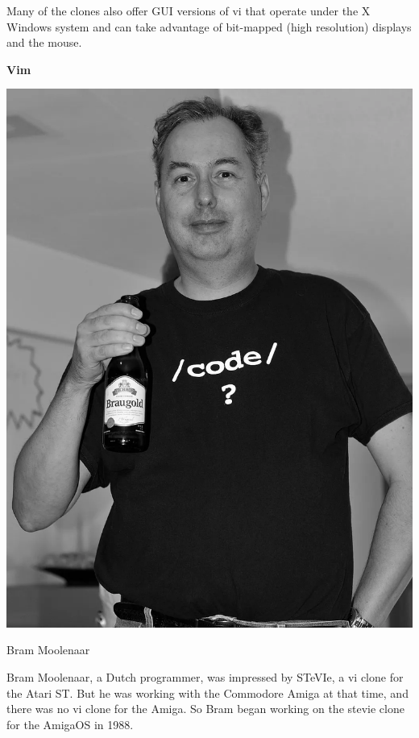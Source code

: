 Many of the clones also offer GUI versions of vi that operate under the X Windows system and can take advantage of bit-mapped (high resolution) displays and the mouse.

\textbf{Vim}

\begin{marginfigure}
  \includegraphics{images/png/bram.png}
  \caption{Bram Moolenaar}
\end{marginfigure}

Bram Moolenaar, a Dutch programmer, was impressed by
STeVIe, a vi clone for the Atari ST.
But he was working with the Commodore Amiga at that time,
and there was no vi clone for the Amiga.
So Bram began working on the stevie clone
for the AmigaOS in 1988.

